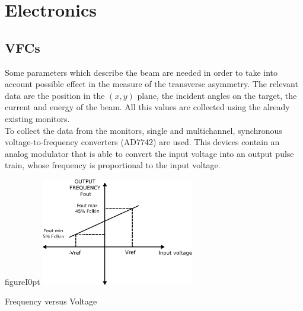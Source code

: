 \section{Electronics}


\subsection{VFCs}

Some parameters which describe the beam are needed in order to take into account possible effect in the measure of the transverse asymmetry. The relevant data are the position in the $(x,y)$ plane, the incident angles on the target, the current and energy of the beam. All this values are collected using the already existing monitors. \\
To collect the data from the monitors, single and multichannel, synchronous voltage-to-frequency converters (AD7742) are used. This devices contain an analog modulator that is able to convert the input voltage into an output pulse train, whose frequency is proportional to the input voltage. 

\begin{wrapfloat}{figure}{I}{0pt}
\includegraphics[width=0.5\textwidth]{ExperimentalSetup/Vfc.pdf}
\caption{Frequency versus Voltage}
\vspace{10pt}
\end{wrapfloat}

